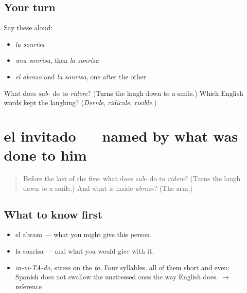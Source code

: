 \subsection*{Your turn}
Say these aloud:

\begin{itemize}
\raggedright
  \item \emph{la sonrisa}
  \item \emph{una sonrisa}, then \emph{la sonrisa}
  \item \emph{el abrazo} and \emph{la sonrisa}, one after the other
\end{itemize}

\begin{tcolorbox}[breakable,colback=teal!4,colframe=teal!35!black,title={Before you move on}]
What does \emph{sub-} do to \emph{ridere}? (Turns the laugh down to a smile.) Which English words kept the laughing? (\emph{Deride}, \emph{ridicule}, \emph{risible}.)
\end{tcolorbox}
\section[el invitado]{el invitado — named by what was done to him}

\label{lesson:ES-C282-invitado}



\begin{quote}
Before the last of the five: what does \emph{sub-} do to \emph{ridere}? (Turns the laugh down to a smile.) And what is inside \emph{abrazo}? (The arm.)
\end{quote}

\subsection*{What to know first}
\begin{itemize}
\raggedright
  \item el abrazo — what you might give this person.
  \item la sonrisa — and what you would give with it.
\end{itemize}

\begin{sounds}
\begin{itemize}
\raggedright
  \item \emph{in-vi-TA-do}, stress on the \emph{ta}. Four syllables, all of them short and even; Spanish does not swallow the unstressed ones the way English does. $\to$ reference
\end{itemize}
\end{sounds}

